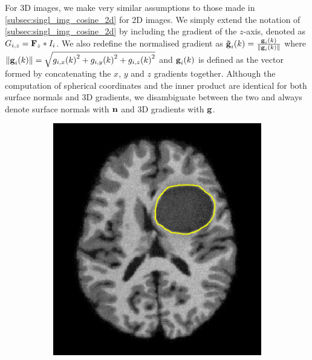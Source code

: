 For 3D images, we make very similar
assumptions to those made in \cref{subsec:singl_img_cosine_2d} for 2D images.
We simply extend the notation of \cref{subsec:singl_img_cosine_2d} by including the
gradient of the $z$-axis, denoted as $G_{i,z} = \boldsymbol{\mathbf{F}}_z \ast I_i$.
We also redefine the normalised gradient as
$\boldsymbol{\mathbf{\tilde{g}}}_{i}(k) = \frac{\boldsymbol{\mathbf{g}}_{i}(k)}{\lVert{} \boldsymbol{\mathbf{g}}_{i}(k) \rVert}$
where $\lVert{} \boldsymbol{\mathbf{g}}_{i}(k) \rVert = \sqrt{{g_{i,x}(k)}^2 + {g_{i,y}(k)}^2 +
{g_{i,z}(k)}^2}$ and $\boldsymbol{\mathbf{g}}_{i}(k)$ is defined as the vector formed by
concatenating the $x$, $y$ and $z$ gradients together. Although the
computation of spherical coordinates and the inner product are identical for
both surface normals and 3D gradients, we disambiguate between the two and
always denote surface normals with $\boldsymbol{\mathbf{n}}$ and 3D gradients with $\boldsymbol{\mathbf{g}}$.
\begin{figure}
    \centering
    \begin{subfigure}{0.32\textwidth}
        \includegraphics[width=\textwidth]{statistical_normals/images/tumour_example_axial}
    \end{subfigure}
    \begin{subfigure}{0.32\textwidth}

\end{subfigure}
\end{figure}

